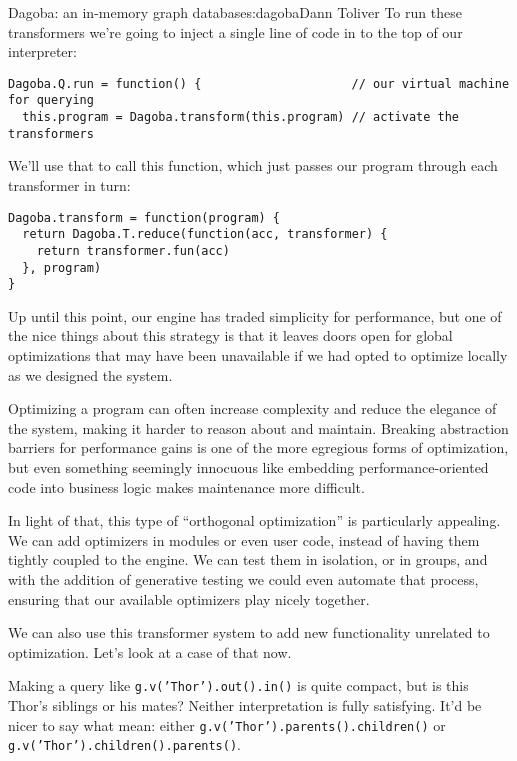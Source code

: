 \begin{aosachapter}{Dagoba: an in-memory graph database}{s:dagoba}{Dann Toliver}
To run these transformers we're going to inject a single line of code in
to the top of our interpreter:

\begin{verbatim}
Dagoba.Q.run = function() {                     // our virtual machine for querying
  this.program = Dagoba.transform(this.program) // activate the transformers
\end{verbatim}

We'll use that to call this function, which just passes our program
through each transformer in turn:

\begin{verbatim}
Dagoba.transform = function(program) {
  return Dagoba.T.reduce(function(acc, transformer) {
    return transformer.fun(acc)
  }, program)
}
\end{verbatim}

Up until this point, our engine has traded simplicity for performance,
but one of the nice things about this strategy is that it leaves doors
open for global optimizations that may have been unavailable if we had
opted to optimize locally as we designed the system.

Optimizing a program can often increase complexity and reduce the
elegance of the system, making it harder to reason about and maintain.
Breaking abstraction barriers for performance gains is one of the more
egregious forms of optimization, but even something seemingly innocuous
like embedding performance-oriented code into business logic makes
maintenance more difficult.

In light of that, this type of ``orthogonal optimization'' is
particularly appealing. We can add optimizers in modules or even user
code, instead of having them tightly coupled to the engine. We can test
them in isolation, or in groups, and with the addition of generative
testing we could even automate that process, ensuring that our available
optimizers play nicely together.

We can also use this transformer system to add new functionality
unrelated to optimization. Let's look at a case of that now.

\label{aliases}

Making a query like \texttt{g.v('Thor').out().in()} is quite compact,
but is this Thor's siblings or his mates? Neither interpretation is
fully satisfying. It'd be nicer to say what mean: either
\texttt{g.v('Thor').parents().children()} or
\texttt{g.v('Thor').children().parents()}.


\end{aosachapter}
